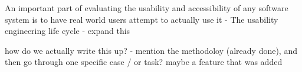 {\color{blue}
An important part of evaluating the usability and accessibility of any software system is to have real world users attempt to actually use it - The usability engineering life cycle \cite{nielsen1992usability} - expand this
}

{\color{red}
	how do we actually write this up? - mention the methodoloy (already done), and then go through one specific case / or task? maybe a feature that was added
}